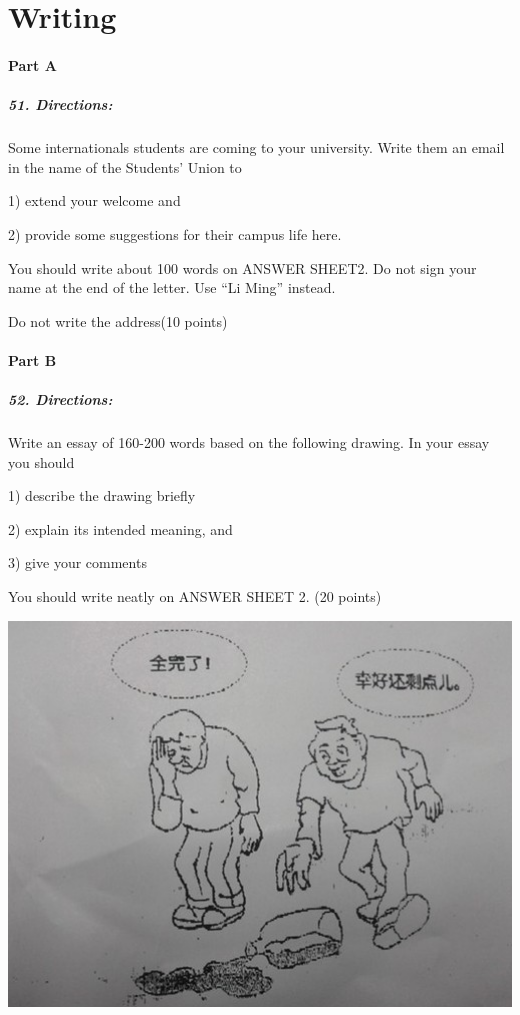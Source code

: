 \section{Writing}
\paragraph{Part A}
\subparagraph{51. Directions:}

Some internationals students are coming to your university. Write them an email in the name of the Students’ Union to

1) extend your welcome and

2) provide some suggestions for their campus life here.

You should write about 100 words on ANSWER SHEET2. Do not sign your name at the end of the letter. Use “Li Ming” instead.

Do not write the address(10 points)

\paragraph{Part B}
\subparagraph{52. Directions:}

Write an essay of 160-200 words based on the following drawing. In your essay you should

1) describe the drawing briefly

2) explain its intended meaning, and

3) give your comments

You should write neatly on ANSWER SHEET 2. (20 points)

\includegraphics[width=14cm]{8.jpg}

